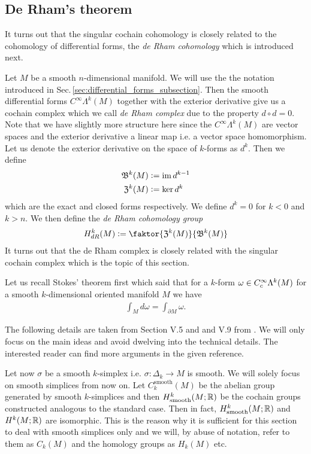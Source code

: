 \documentclass[../master_thesis.tex]{subfiles}
\begin{document}
\subsection{De Rham's theorem} \label{sec:de_rhams_theorem}

It turns out that the singular cochain cohomology is closely related to the cohomology 
of differential forms, the \textit{de Rham cohomology} which is introduced next. 

Let $M$ be a smooth $n$-dimensional manifold.
We will use the the notation introduced in 
Sec.\,\ref{sec:differential_forms_subsection}. Then the smooth 
differential forms $C^\infty \Lambda^k (M)$ together 
with the exterior derivative give us a cochain complex which we call 
\textit{de Rham complex} due to the property $d \circ d = 0$. 
Note that we have slightly more structure here
since the $C^\infty \Lambda^k (M)$ are vector spaces and the exterior
derivative a linear map i.e. a vector space homomorphism.
Let us denote the exterior derivative on 
the space of $k$-forms as $d^k$. Then we define
\begin{align*}
    \mathfrak{B}^k(M) &\vcentcolon= \operatorname{im} d^{k-1}
    \\ \mathfrak{Z}^k(M) &\vcentcolon= \ker d^k
\end{align*}
which are the exact and closed forms respectively.
We define $d^k = 0$ for $k < 0$ and $k>n$.
We then define the \textit{de Rham cohomology group} 
\begin{align*}
    H_{dR}^k(M) \vcentcolon= \faktor{\mathfrak{Z}^k(M)}{\mathfrak{B}^k(M)}
\end{align*}
It turns out that the de Rham complex is closely related with the 
singular cochain complex which is the topic of this section.

Let us recall Stokes' theorem first which said 
that for a $k$-form $\omega \in C_c^\infty \Lambda^{k}(M)$ 
for a smooth $k$-dimensional oriented manifold $M$ we have 
\begin{align*}
    \int_M d\omega = \int_{\partial M} \omega.
\end{align*}

The following details are taken from Section V.5 and and V.9 from 
\cite{topology_and_geometry}. We will only focus on the main ideas and avoid 
dwelving into the technical details. The interested reader can find more 
arguments in the given reference.

Let now $\sigma$ be a smooth $k$-simplex i.e. $\sigma: \Delta_k \rightarrow 
M$ is smooth. We will solely focus on smooth simplices from now on. Let 
$C_k^{\text{smooth}}(M)$ be the abelian group generated by smooth $k$-simplices and 
then $H^k_{\text{smooth}}(M;\mathbb{R})$ be the cochain groups constructed analogous to the 
standard case. Then in fact, 
$H^k_{\text{smooth}}(M;\mathbb{R})$ and $H^k(M;\mathbb{R})$ are isomorphic. This 
is the reason why it is sufficient for this section to deal with smooth simplices 
only and we will, by abuse of notation, refer to them as $C_k(M)$
and the homology groups as $H_k(M)$ etc.
\end{document}
